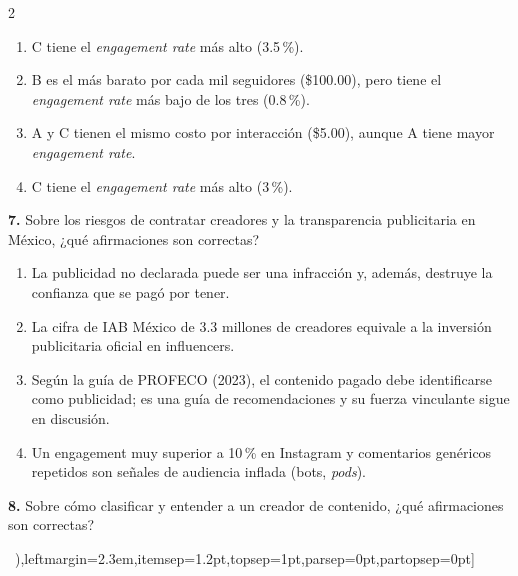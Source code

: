 \documentclass[10pt,letterpaper]{article}
\newcommand{\cas}{\framebox[1.0em]{\rule{0pt}{1.05ex}}}
\begin{document}
\begin{multicols}{2}
\begin{minipage}[t]{\columnwidth}
\vspace{1pt}\begin{enumerate}[label=\cas\ \alph*),leftmargin=2.3em,itemsep=1.2pt,topsep=1pt,parsep=0pt,partopsep=0pt]
\item C tiene el \textit{engagement rate} más alto (3.5\,\%).
\item B es el más barato por cada mil seguidores (\$100.00), pero tiene el \textit{engagement rate} más bajo de los tres (0.8\,\%).
\item A y C tienen el mismo costo por interacción (\$5.00), aunque A tiene mayor \textit{engagement rate}.
\item C tiene el \textit{engagement rate} más alto (3\,\%).
\end{enumerate}\end{minipage}\par\vspace{3pt}
\begin{minipage}[t]{\columnwidth}\noindent\textbf{7.} Sobre los riesgos de contratar creadores y la transparencia publicitaria en México, ¿qué afirmaciones son correctas?
\vspace{1pt}\begin{enumerate}[label=\cas\ \alph*),leftmargin=2.3em,itemsep=1.2pt,topsep=1pt,parsep=0pt,partopsep=0pt]
\item La publicidad no declarada puede ser una infracción y, además, destruye la confianza que se pagó por tener.
\item La cifra de IAB México de 3.3 millones de creadores equivale a la inversión publicitaria oficial en influencers.
\item Según la guía de PROFECO (2023), el contenido pagado debe identificarse como publicidad; es una guía de recomendaciones y su fuerza vinculante sigue en discusión.
\item Un engagement muy superior a 10\,\% en Instagram y comentarios genéricos repetidos son señales de audiencia inflada (bots, \textit{pods}).
\end{enumerate}\end{minipage}\par\vspace{3pt}
\begin{minipage}[t]{\columnwidth}\noindent\textbf{8.} Sobre cómo clasificar y entender a un creador de contenido, ¿qué afirmaciones son correctas?
\vspace{1pt}\begin{enumerate}[label=\cas\ \alph*),leftmargin=2.3em,itemsep=1.2pt,topsep=1pt,parsep=0pt,partopsep=0pt]

\end{enumerate}
\end{minipage}
\end{multicols}
\end{document}
